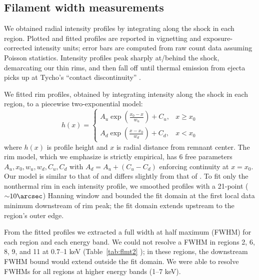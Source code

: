 \documentclass[12pt,preprint]{aastex}  %
\newcommand*{\abt}{\mathord{\sim}} %
\begin{document}
\subsection{Filament width measurements}

We obtained radial intensity profiles by integrating along the shock in each
region.  Plotted and fitted profiles are reported in vignetting and
exposure-corrected  intensity units;
error bars are computed from raw count data assuming Poisson statistics.
Intensity profiles peak sharply at/behind the shock, demarcating our
thin rims, 
and then fall off until thermal emission from ejecta picks up at Tycho's
``contact discontinuity'' \citep{warren2005}.

We fitted rim profiles, obtained by integrating intensity along the shock in
each region, to a piecewise two-exponential model:
\begin{equation} \label{eq:prof}
    h(x) =
    \begin{cases}
        A_u \exp \left(\frac{x_0 - x}{w_u}\right) + C_u, &x \geq x_0 \\
        A_d \exp \left(\frac{x - x_0}{w_d}\right) + C_d, &x < x_0
    \end{cases}
\end{equation}
where $h(x)$ is profile height and $x$ is radial distance from remnant center.
The rim model, which we emphasize is strictly empirical, has 6 free parameters
$A_u, x_0, w_u, w_d, C_u, C_d$ with $A_d = A_u + (C_u - C_d)$ enforcing
continuity at $x=x_0$. Our model is similar to that of \citet{bamba2003,
bamba2005-hist} and differs slightly from that of .
To fit only the nonthermal rim in each intensity profile, we smoothed profiles
with a 21-point ($\abt 10\arcsec$) Hanning window and bounded the fit
domain at the first local data minimum downstream of rim peak; the fit domain
extends upstream to the region's outer edge.

From the fitted profiles we extracted a full width at half maximum (FWHM) for
each region and each energy band.
We could not resolve a FWHM in regions 2, 6, 8, 9, and 11  at 0.7--1 keV (Table~\ref{tab:flmt2} ); in these regions, the downstream FWHM bound
would extend outside the fit domain.  We were able to resolve FWHMs for all
regions at higher energy bands (1--7 keV).
\end{document}

